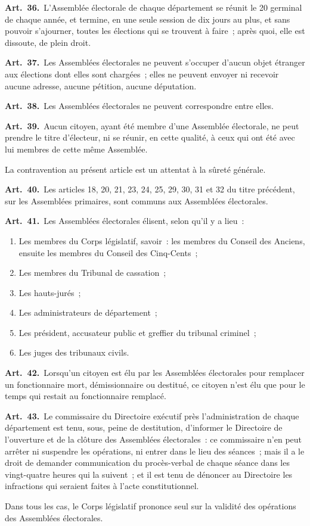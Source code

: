 \documentclass[french,twoside]{book} %
\newcommand{\labelchar}[1]{\textbf{\color{rubric} #1}}
\begin{document}
\labelchar{Art. 36.} L’Assemblée électorale de chaque département se réunit le 20 germinal de chaque année, et termine, en une seule session de dix jours au plus, et sans pouvoir s’ajourner, toutes les élections qui se trouvent à faire ; après quoi, elle est dissoute, de plein droit.\par
\labelchar{Art. 37.} Les Assemblées électorales ne peuvent s’occuper d’aucun objet étranger aux élections dont elles sont chargées ; elles ne peuvent envoyer ni recevoir aucune adresse, aucune pétition, aucune députation.\par
\labelchar{Art. 38.} Les Assemblées électorales ne peuvent correspondre entre elles.\par
\labelchar{Art. 39.} Aucun citoyen, ayant été membre d’une Assemblée électorale, ne peut prendre le titre d’électeur, ni se réunir, en cette qualité, à ceux qui ont été avec lui membres de cette même Assemblée.\par
La contravention au présent article est un attentat à la sûreté générale.\par
\labelchar{Art. 40.} Les articles 18, 20, 21, 23, 24, 25, 29, 30, 31 et 32 du titre précédent, sur les Assemblées primaires, sont communs aux Assemblées électorales.\par
\labelchar{Art. 41.} Les Assemblées électorales élisent, selon qu’il y a lieu :\par

\begin{enumerate}[itemsep=0pt,topsep=0pt,partopsep=0pt,parskip=0pt]
\item Les membres du Corps législatif, savoir : les membres du Conseil des Anciens, ensuite les membres du Conseil des Cinq-Cents ;
\item Les membres du Tribunal de cassation ;
\item Les hauts-jurés ;
\item Les administrateurs de département ;
\item Les président, accusateur public et greffier du tribunal criminel ;
\item Les juges des tribunaux civils.
\end{enumerate}

\labelchar{Art. 42.} Lorsqu’un citoyen est élu par les Assemblées électorales pour remplacer un fonctionnaire mort, démissionnaire ou destitué, ce citoyen n’est élu que pour le temps qui restait au fonctionnaire remplacé.\par
\labelchar{Art. 43.} Le commissaire du Directoire exécutif près l’administration de chaque département est tenu, sous, peine de destitution, d’informer le Directoire de l’ouverture et de la clôture des Assemblées électorales : ce commissaire n’en peut arrêter ni suspendre les opérations, ni entrer dans le lieu des séances ; mais il a le droit de demander communication du procès-verbal de chaque séance dans les vingt-quatre heures qui la suivent ; et il est tenu de dénoncer au Directoire les infractions qui seraient faites à l’acte constitutionnel.\par
Dans tous les cas, le Corps législatif prononce seul sur la validité des opérations des Assemblées électorales.\par
\bigbreak
\end{document}
